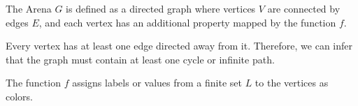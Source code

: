 
The Arena  $G$ is defined as a directed graph where vertices $V$ are connected by edges $E$, and each vertex has an additional property mapped by the function $f$.


Every vertex has at least one edge directed away from it. Therefore, we can infer that the graph must contain at least one cycle or infinite path.

The function $f$ assigns labels or values from a finite set $L$ to the vertices as colors.